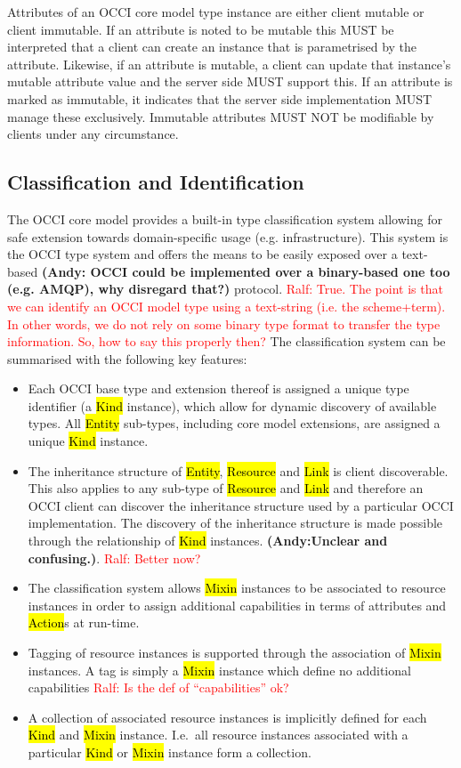 \documentclass[10pt,a4paper]{article}
\newcommand{\ralf}[1]{\textcolor{red}{Ralf: #1}}
\begin{document}
Attributes of an OCCI core model type instance are
either client mutable or client immutable. If an attribute is noted to
be mutable this MUST be interpreted that a client can create an
instance that is parametrised by the attribute. Likewise, if
an attribute is mutable, a client can update that instance's
mutable attribute value and the server side MUST support this. If an
attribute is marked as immutable, it indicates that the server side
implementation MUST manage these exclusively. Immutable attributes
MUST NOT be modifiable by clients under any circumstance.

\subsection{Classification and Identification}
\label{sec:classification}
The OCCI core model provides a built-in type classification system allowing for safe
extension towards domain-specific usage (e.g. infrastructure). This system is the OCCI type system
and offers the means to be easily exposed over a text-based 
\textbf{(Andy: OCCI could be implemented over a binary-based one too (e.g. AMQP), why disregard that?)} protocol.
\ralf{True. The point is that we can identify an OCCI model type using a text-string (i.e. the scheme+term). In other words, we do not rely on some binary type format to transfer the type information. So, how to say this properly then?}
%
The classification system can be summarised with the following key features:
\begin{itemize}
\item Each OCCI base type and extension thereof is assigned a unique type
 identifier (a \hl{Kind} instance), which allow for dynamic discovery of
 available types. All \hl{Entity} sub-types, including core model extensions, are assigned
 a unique \hl{Kind} instance.
\item The inheritance structure of \hl{Entity}, \hl{Resource} and \hl{Link} is
 client discoverable. This also applies to any sub-type of \hl{Resource} and
 \hl{Link} and therefore an OCCI client can discover the inheritance structure
 used by a particular OCCI implementation. The discovery of the inheritance
 structure is made possible through the relationship of \hl{Kind} instances.
\textbf{(Andy:Unclear and confusing.)}.
\ralf{Better now?}
\item The classification system allows \hl{Mixin} instances to be associated
 to resource instances in order to assign additional capabilities in terms of
 attributes and \hl{Action}s at run-time.
\item Tagging of resource instances is supported through the association
 of \hl{Mixin} instances. A tag is simply a \hl{Mixin} instance which define no
 additional capabilities \ralf{Is the def of ``capabilities'' ok?}
\item A collection of associated resource instances is implicitly defined for
 each \hl{Kind} and \hl{Mixin} instance. I.e.~all resource instances associated
 with a particular \hl{Kind} or \hl{Mixin} instance form a collection.
\end{itemize}
\end{document}
